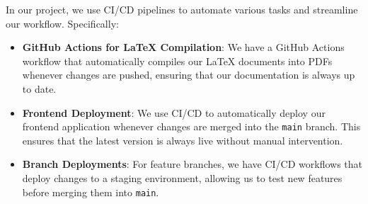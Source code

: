 \documentclass{article}
\begin{document}
In our project, we use CI/CD pipelines to automate various tasks and streamline our workflow. Specifically:

\begin{itemize}
    \item \textbf{GitHub Actions for LaTeX Compilation}: We have a GitHub Actions workflow that automatically compiles our LaTeX documents into PDFs whenever changes are pushed, ensuring that our documentation is always up to date.
    \item \textbf{Frontend Deployment}: We use CI/CD to automatically deploy our frontend application whenever changes are merged into the \texttt{main} branch. This ensures that the latest version is always live without manual intervention.
    \item \textbf{Branch Deployments}: For feature branches, we have CI/CD workflows that deploy changes to a staging environment, allowing us to test new features before merging them into \texttt{main}.
\end{itemize}



\end{document}
